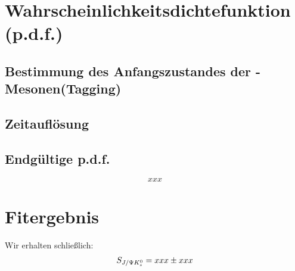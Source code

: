 \section{Wahrscheinlichkeitsdichtefunktion (p.d.f.)}
\subsection{Bestimmung des Anfangszustandes der \Bd-Mesonen(Tagging)}
\subsection{Zeitauflösung}
\subsection{Endgültige p.d.f.}
\begin{equation}
xxx     \label{eg:fit_pdf}
\end{equation}



\section{Fitergebnis} \label{kap:fitergebnis}
Wir erhalten schließlich:
\begin{align}
S_{J/\Psi K_s^0} = xxx \pm xxx     \label{eq:fit_result}
\end{align}